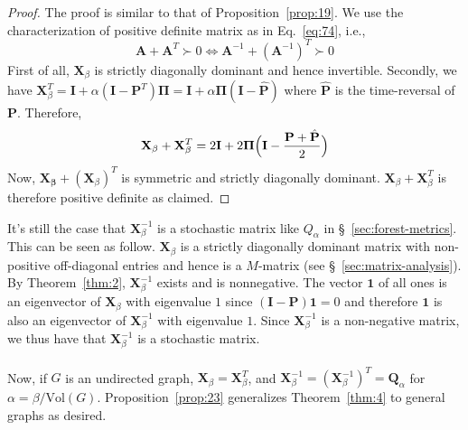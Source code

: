 \begin{proof}
  The proof is similar to that of Proposition~\ref{prop:19}.  We use
  the characterization of positive definite matrix as in
  Eq.~\eqref{eq:74}, i.e.,
\begin{equation*}
    \mathbf{A} + \mathbf{A}^{T} \succ 0 \Leftrightarrow
    \mathbf{A}^{-1} + (\mathbf{A}^{-1})^{T} \succ 0
\end{equation*}
First of all, $\mathbf{X}_{\beta}$ is strictly diagonally dominant
and hence invertible. Secondly, we have $\mathbf{X}_{\beta}^{T} =
\mathbf{I} + \alpha (\mathbf{I} - \mathbf{P}^{T}) \bm{\Pi} =
\mathbf{I} + \alpha \bm{\Pi} (\mathbf{I} - \hat{\mathbf{P}})$ where
$\hat{\mathbf{P}}$ is the time-reversal of $\mathbf{P}$. Therefore, 
\begin{equation}
  \label{eq:82}
  \mathbf{X}_{\beta} + \mathbf{X}_{\beta}^{T} = 2 \mathbf{I}
  + 2 \bm{\Pi}\Bigl(\mathbf{I} - \frac{\mathbf{P} + \hat{\mathbf{P}}}{2}
  \Bigr)
\end{equation}
Now, $\mathbf{X_{\beta}} + (\mathbf{X}_{\beta})^{T}$ is symmetric and
strictly diagonally dominant. $\mathbf{X}_\beta +
\mathbf{X}_{\beta}^{T}$ is therefore positive definite as claimed.  
\end{proof}
It's still the case that $\mathbf{X}_{\beta}^{-1}$ is a stochastic
matrix like $Q_{\alpha}$ in \S~\ref{sec:forest-metrics}. This can be seen as
follow. $\mathbf{X}_{\beta}$ is a strictly diagonally dominant matrix
with non-positive off-diagonal entries and hence is a $M$-matrix (see
\S~\ref{sec:matrix-analysis}). By
Theorem~\ref{thm:2}, $\mathbf{X}_{\beta}^{-1}$ exists and is
nonnegative. The vector $\bm{1}$ of all ones is an eigenvector of
$\mathbf{X}_{\beta}$ with eigenvalue $1$ since $(\mathbf{I} -
\mathbf{P})\bm{1} = 0$ and therefore $\bm{1}$ is also an eigenvector
of $\mathbf{X}_{\beta}^{-1}$ with eigenvalue $1$. Since
$\mathbf{X}_{\beta}^{-1}$ is a non-negative matrix, we thus have that
$\mathbf{X}_{\beta}^{-1}$ is a stochastic
matrix. \\ \\
%
%
Now, if $G$ is an undirected graph, $\mathbf{X}_{\beta} =
\mathbf{X}_{\beta}^{T}$, and $\mathbf{X}_{\beta}^{-1} =
(\mathbf{X}_{\beta}^{-1})^{T} = \mathbf{Q}_{\alpha}$ for $\alpha =
\beta/\mathrm{Vol}(G)$. Proposition~\ref{prop:23} generalizes
Theorem~\ref{thm:4} to general graphs as desired.

